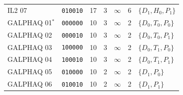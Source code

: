 \begin{longtable}{@{}lcrrrrl@{}}
IL2 07 & \texttt{010010} & 17 & 3 & $\infty$ & 6 & $\{D_{1},H_{0},P_{1}\}$\\
GALPHAQ 01$^*$ & \texttt{000000} & 10 & 3 & $\infty$ & 2 & $\{D_{0},T_{0},P_{0}\}$\\
GALPHAQ 02 & \texttt{000010} & 10 & 3 & $\infty$ & 2 & $\{D_{0},T_{0},P_{1}\}$\\
GALPHAQ 03 & \texttt{100000} & 10 & 3 & $\infty$ & 2 & $\{D_{0},T_{1},P_{0}\}$\\
GALPHAQ 04 & \texttt{100010} & 10 & 3 & $\infty$ & 2 & $\{D_{0},T_{1},P_{1}\}$\\
GALPHAQ 05 & \texttt{010000} & 10 & 2 & $\infty$ & 2 & $\{D_{1},P_{0}\}$\\
GALPHAQ 06 & \texttt{010010} & 10 & 2 & $\infty$ & 2 & $\{D_{1},P_{1}\}$\\
\end{longtable}


